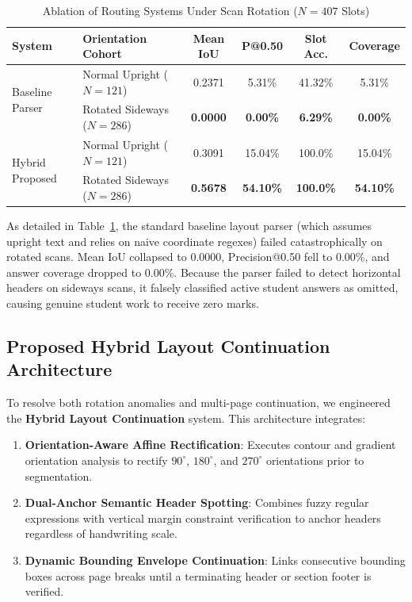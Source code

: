 \documentclass[journal]{IEEEtran}
\begin{document}
\begin{table}[t]
\centering
\caption{Ablation of Routing Systems Under Scan Rotation ($N = 407$ Slots)}
\label{tab:rotation_ablation}
\begin{tabular}{llcccc}
\toprule
\textbf{System} & \textbf{Orientation Cohort} & \textbf{Mean IoU} & \textbf{P@0.50} & \textbf{Slot Acc.} & \textbf{Coverage} \\
\midrule
\multirow{2}{*}{Baseline Parser} & Normal Upright ($N=121$) & 0.2371 & 5.31\% & 41.32\% & 5.31\% \\
& Rotated Sideways ($N=286$) & \textbf{0.0000} & \textbf{0.00\%} & \textbf{6.29\%} & \textbf{0.00\%} \\
\midrule
\multirow{2}{*}{Hybrid Proposed} & Normal Upright ($N=121$) & 0.3091 & 15.04\% & 100.0\% & 15.04\% \\
& Rotated Sideways ($N=286$) & \textbf{0.5678} & \textbf{54.10\%} & \textbf{100.0\%} & \textbf{54.10\%} \\
\bottomrule
\end{tabular}
\end{table}

As detailed in Table~\ref{tab:rotation_ablation}, the standard baseline layout parser (which assumes upright text and relies on naive coordinate regexes) failed catastrophically on rotated scans. Mean IoU collapsed to 0.0000, Precision@0.50 fell to 0.00\%, and answer coverage dropped to 0.00\%. Because the parser failed to detect horizontal headers on sideways scans, it falsely classified active student answers as omitted, causing genuine student work to receive zero marks.

\subsection{Proposed Hybrid Layout Continuation Architecture}
To resolve both rotation anomalies and multi-page continuation, we engineered the \textbf{Hybrid Layout Continuation} system. This architecture integrates:
\begin{enumerate}
    \item \textbf{Orientation-Aware Affine Rectification}: Executes contour and gradient orientation analysis to rectify $90^\circ$, $180^\circ$, and $270^\circ$ orientations prior to segmentation.
    \item \textbf{Dual-Anchor Semantic Header Spotting}: Combines fuzzy regular expressions with vertical margin constraint verification to anchor headers regardless of handwriting scale.
    \item \textbf{Dynamic Bounding Envelope Continuation}: Links consecutive bounding boxes across page breaks until a terminating header or section footer is verified.
\end{enumerate}
\end{document}
